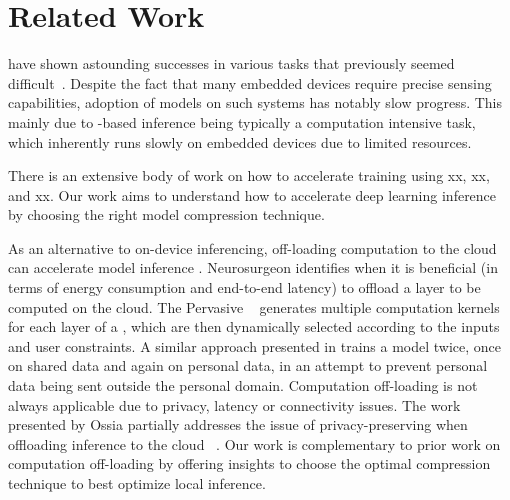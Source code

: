 \section{Related Work}
\DNNs have shown astounding successes in various tasks that previously seemed difficult~\cite{}. Despite the fact that many embedded
devices require precise sensing capabilities, adoption of \DNN models on such systems has notably slow progress. This mainly due to
\DNN-based inference being typically a computation intensive task, which inherently runs slowly on embedded devices due to limited
resources.


There is an extensive body of work on how to accelerate \DNN training using xx, xx, and xx. Our work aims to understand how to accelerate
deep learning inference by choosing the right model compression technique.


As an alternative to on-device inferencing, off-loading computation to the cloud can accelerate \DNN model inference
\cite{teerapittayanon2017distributed}. Neurosurgeon \cite{Kang2017neurosurgeon} identifies when it is beneficial (\eg in terms of energy
consumption and end-to-end latency) to offload a \DNN layer to be computed on the cloud. The Pervasive \CNN~\cite{7920809} generates
multiple computation kernels for each layer of a \CNN, which are then dynamically selected according to the inputs and user constraints. A
similar approach presented in \cite{RodriguezWZMH17} trains a model twice, once on shared data and again on personal data, in an attempt to
prevent personal data being sent outside the personal domain. Computation off-loading is not always applicable due to privacy, latency or
connectivity issues. The work presented by Ossia \etal partially addresses the issue of privacy-preserving when offloading \DNN inference
to the cloud ~\cite{ossia2017hybrid}. Our work is complementary to prior work on computation off-loading by offering insights to choose the
optimal compression technique to best optimize local inference.
